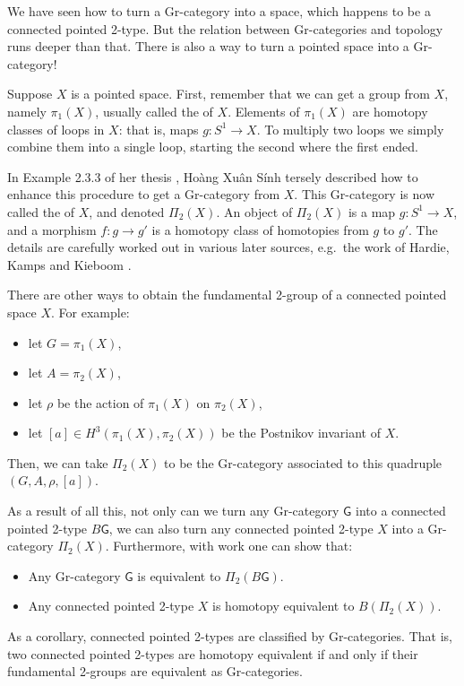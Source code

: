 \documentclass[reqno]{amsart}
\newcommand{\maps}{\colon}    %
\newcommand{\G}{{\mathsf{G}}}   %
\newcommand{\define}[1]{\textbf{\boldmath{#1}}}
\theoremstyle{definition}
\begin{document}
We have seen how to turn a Gr-category into a space, which happens to be a connected pointed 2-type.  But the relation between Gr-categories and topology runs deeper than that.  There is also a way to turn a pointed space into a Gr-category!  

Suppose $X$ is a pointed space.  First, remember that we can get a group from $X$, namely $\pi_1(X)$, usually called the \define{fundamental group} of $X$.   Elements of $\pi_1(X)$ are homotopy classes of loops in $X$: that is, maps $g \maps S^1 \to X$.   To multiply two loops we simply combine them into a single loop, starting the second where the first ended.    

In Example 2.3.3 of her thesis \cite{H73}, Ho\`ang Xu\^an S\'inh tersely described how to enhance this procedure to get a Gr-category from $X$.  This Gr-category is now called the \define{fundamental 2-group} of $X$, and denoted $\Pi_2(X)$.   An object of $\Pi_2(X)$ is a map $g \maps S^1 \to X$, and a morphism $f \maps g \to g'$ is a homotopy class of homotopies from $g$ to $g'$.  The details are carefully worked out in various later sources, e.g.\ the work of Hardie, Kamps and Kieboom \cite{HKK00,HKK01}. 

There are other ways to obtain the fundamental 2-group of a connected pointed space $X$.  For example:
\begin{itemize}
\item let $G = \pi_1(X)$,
\item let $A = \pi_2(X)$,
\item let $\rho$ be the action of $\pi_1(X)$ on $\pi_2(X)$,
\item let $[a] \in H^3(\pi_1(X),\pi_2(X))$ be the Postnikov invariant of $X$.
\end{itemize}
Then, we can take $\Pi_2(X)$ to be the Gr-category associated to this quadruple $(G,A,\rho, [a])$.  

As a result of all this, not only can we turn any Gr-category $\G$ into a 
connected pointed 2-type $B\G$, we can also turn any connected pointed 2-type $X$ into a Gr-category $\Pi_2(X)$.   Furthermore, with work 
one can show that:
\begin{itemize}
\item Any Gr-category $\G$ is equivalent to $\Pi_2(B\G)$.
\item Any connected pointed 2-type $X$ is homotopy equivalent to 
$B(\Pi_2(X))$.
\end{itemize}
As a corollary, connected pointed 2-types are classified by Gr-categories.  That is, two connected pointed 2-types are homotopy equivalent if and only if their fundamental 2-groups are equivalent as Gr-categories.
\end{document}
